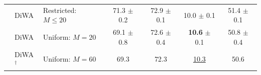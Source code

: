 \begin{table}[h]
{\begin{tabular}{lll|cccc}
                                                       & DiWA                             & Restricted: $M \leq 20$   & 71.3 $\pm$ 0.2             & 72.9 $\pm$ 0.1             & 10.0 $\pm$ 0.1             & 51.4 $\pm$ 0.1            \\
                                                       & DiWA                             & Uniform: $M=20$           & 69.1 $\pm$ 0.8             & 72.6 $\pm$ 0.4             & \textbf{10.6} $\pm$ 0.1    & 50.8 $\pm$ 0.4            \\
                                                       & DiWA$^{\dagger}$                 & Uniform: $M=60$           & 69.3                       & 72.3                       & \underline{10.3}           & 50.6                      \\
            \bottomrule
        \end{tabular}}
    \label{table:db_cmnist_training}%
\end{table}
